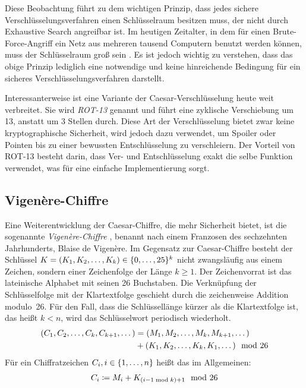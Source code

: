Diese Beobachtung führt zu dem wichtigen Prinzip, dass jedes sichere
Verschlüsselungsverfahren einen Schlüsselraum besitzen muss, der nicht
durch Exhaustive Search angreifbar ist. Im heutigen Zeitalter, in dem
für einen Brute-Force-Angriff \indexBruteForce ein Netz aus mehreren
tausend Computern benutzt werden können, muss der Schlüsselraum groß
sein \cite{NIST_800_57, Blaze1996}. Es ist jedoch wichtig zu verstehen,
dass das obige Prinzip lediglich eine notwendige und keine hinreichende
Bedingung für ein sicheres Verschlüsselungsverfahren darstellt. 

Interessanterweise ist eine Variante der Caesar-Verschlüsselung heute
weit verbreitet. Sie wird \emph{ROT-13} \indexCaesarROT genannt und
führt eine zyklische Verschiebung um 13, anstatt um 3 Stellen
durch. Diese Art der Verschlüsselung bietet zwar keine kryptographische
Sicherheit, wird jedoch dazu verwendet, um Spoiler oder Pointen bis zu
einer bewussten Entschlüsselung zu verschleiern. Der Vorteil von ROT-13
besteht darin, dass Ver- und Entschlüsselung exakt die selbe Funktion
verwendet, was für eine einfache Implementierung sorgt. 

\subsection{Vigenère-Chiffre}
\label{ssec:vigenere}
Eine Weiterentwicklung der Caesar-Chiffre, die mehr Sicherheit bietet,
ist die sogenannte \emph{Vigenère-Chiffre} \indexVignere, benannt nach
einem Franzosen des sechzehnten Jahrhunderts, Blaise de Vigenère. Im
Gegensatz zur Caesar-Chiffre besteht der Schlüssel $K =
(K_{1},K_{2},\dots,K_{k}) \in \{0,\dots,25\}^{k}$ nicht
zwangsläufig aus einem Zeichen, sondern einer Zeichenfolge der Länge $k
\geq 1$.  Der Zeichenvorrat ist das lateinische Alphabet mit seinen 26
Buchstaben. Die Verknüpfung der Schlüsselfolge mit der Klartextfolge
geschieht durch die zeichenweise Addition modulo~26. Für den Fall, dass
die Schlüssellänge kürzer als die Klartextfolge ist, das heißt $k < n$,
wird das Schlüsselwort periodisch wiederholt.
\begin{align*}
  \begin{split}
    (C_{1},C_{2},\dots,C_{k},C_{k+1},\dots) &= (M_{1},M_{2},\dots,M_{k},M_{k+1},\dots)\\ 
    &+ (K_{1},K_{2},\dots,K_{k},K_{1},\dots) \mod 26
  \end{split}
\end{align*}
Für ein Chiffratzeichen $C_{i}, i \in \{1,\dots,n\}$ heißt das im Allgemeinen:
\begin{align*}
  C_{i} \coloneqq M_{i} + K_{(i-1 \bmod k)+1} \mod 26
\end{align*}

